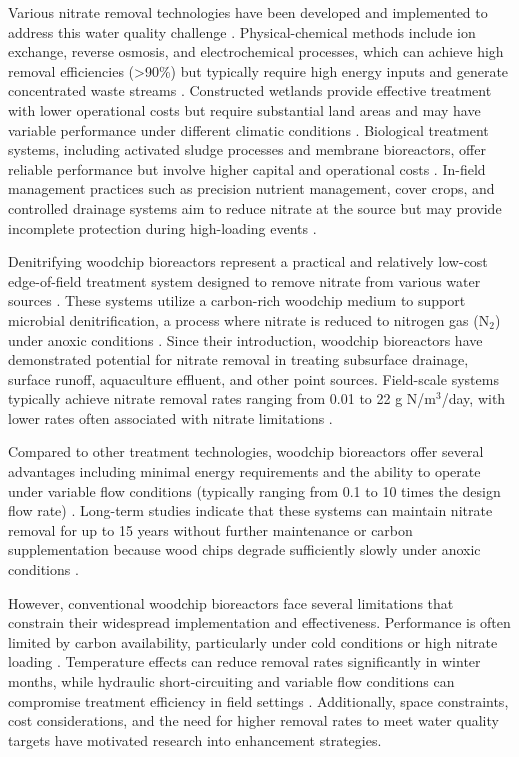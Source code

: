 \documentclass[12pt,a4paper]{article}
\begin{document}
Various nitrate removal technologies have been developed and implemented to address this water quality challenge \citep{RN625, RN826}. Physical-chemical methods include ion exchange, reverse osmosis, and electrochemical processes, which can achieve high removal efficiencies (>90\%) but typically require high energy inputs and generate concentrated waste streams \citep{RN625}. Constructed wetlands provide effective treatment with lower operational costs but require substantial land areas and may have variable performance under different climatic conditions \citep{RN826}. Biological treatment systems, including activated sludge processes and membrane bioreactors, offer reliable performance but involve higher capital and operational costs \citep{RN625}. In-field management practices such as precision nutrient management, cover crops, and controlled drainage systems aim to reduce nitrate at the source but may provide incomplete protection during high-loading events \citep{RN826}.

Denitrifying woodchip bioreactors represent a practical and relatively low-cost edge-of-field treatment system designed to remove nitrate from various water sources \citep{RN625, RN310}. These systems utilize a carbon-rich woodchip medium to support microbial denitrification, a process where nitrate is reduced to nitrogen gas (N$_{2}$) under anoxic conditions \citep{RN242, RN629}. Since their introduction, woodchip bioreactors have demonstrated potential for nitrate removal in treating subsurface drainage, surface runoff, aquaculture effluent, and other point sources. Field-scale systems typically achieve nitrate removal rates ranging from 0.01 to 22 g N/m$^3$/day, with lower rates often associated with nitrate limitations \citep{RN625, RN310}.

Compared to other treatment technologies, woodchip bioreactors offer several advantages including minimal energy requirements and the ability to operate under variable flow conditions (typically ranging from 0.1 to 10 times the design flow rate) \citep{RN625, RN310}. Long-term studies indicate that these systems can maintain nitrate removal for up to 15 years without further maintenance or carbon supplementation because wood chips degrade sufficiently slowly under anoxic conditions \citep{RN625, RN629}.

However, conventional woodchip bioreactors face several limitations that constrain their widespread implementation and effectiveness. Performance is often limited by carbon availability, particularly under cold conditions or high nitrate loading \citep{RN625, RN228, RN258}. Temperature effects can reduce removal rates significantly in winter months, while hydraulic short-circuiting and variable flow conditions can compromise treatment efficiency in field settings \citep{RN228, RN309}. Additionally, space constraints, cost considerations, and the need for higher removal rates to meet water quality targets have motivated research into enhancement strategies.
\end{document}
